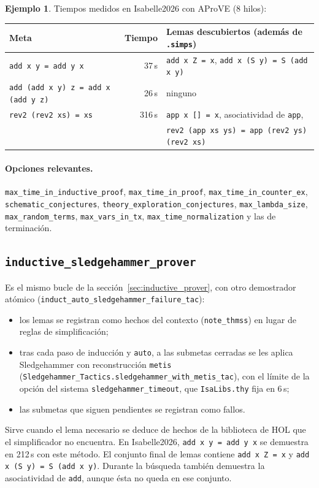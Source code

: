 \documentclass[11pt,a4paper]{article}
\newcommand{\isa}[1]{\texttt{#1}}
\theoremstyle{definition}
\newtheorem{ejemplo}[definicion]{Ejemplo}
\theoremstyle{remark}
\begin{document}
\begin{ejemplo}
Tiempos medidos en Isabelle2026 con AProVE (8 hilos):
\begin{center}
\begin{tabular}{@{}lrl@{}}
\toprule
Meta & Tiempo & Lemas descubiertos (además de \isa{.simps})\\
\midrule
\isa{add x y = add y x} & 37\,s & \isa{add x Z = x}, \isa{add x (S y) = S (add x y)}\\
\isa{add (add x y) z = add x (add y z)} & 26\,s & ninguno\\
\isa{rev2 (rev2 xs) = xs} & 316\,s & \isa{app x [] = x}, asociatividad de \isa{app},\\
 & & \isa{rev2 (app xs ys) = app (rev2 ys) (rev2 xs)}\\
\bottomrule
\end{tabular}
\end{center}
\end{ejemplo}

\paragraph{Opciones relevantes.}
\isa{max\_time\_in\_inductive\_proof}, \isa{max\_time\_in\_proof},
\isa{max\_time\_in\_counter\_ex}, \isa{schematic\_conjectures},
\isa{theory\_exploration\_conjectures}, \isa{max\_lambda\_size},
\isa{max\_random\_terms}, \isa{max\_vars\_in\_tx}, \isa{max\_time\_normalization} y
las de terminación.

\subsection{\texttt{inductive\_sledgehammer\_prover}}

Es el mismo bucle de la sección~\ref{sec:inductive_prover}, con otro demostrador
atómico (\isa{induct\_auto\_sledgehammer\_failure\_tac}):
\begin{itemize}[nosep]
  \item los lemas se registran como hechos del contexto (\isa{note\_thmss}) en lugar
        de reglas de simplificación;
  \item tras cada paso de inducción y \isa{auto}, a las submetas cerradas se les
        aplica Sledgehammer con reconstrucción \isa{metis}
        (\isa{Sledgehammer\_Tactics.sledgehammer\_with\_metis\_tac}), con el límite
        de la opción del sistema \isa{sledgehammer\_timeout}, que \isa{IsaLibs.thy}
        fija en 6\,s;
  \item las submetas que siguen pendientes se registran como fallos.
\end{itemize}
Sirve cuando el lema necesario se deduce de hechos de la biblioteca de HOL que el
simplificador no encuentra. En Isabelle2026, \isa{add x y = add y x} se demuestra en
212\,s con este método. El conjunto final de lemas contiene \isa{add x Z = x} y
\isa{add x (S y) = S (add x y)}. Durante la búsqueda también demuestra la
asociatividad de \isa{add}, aunque ésta no queda en ese conjunto.
\end{document}
